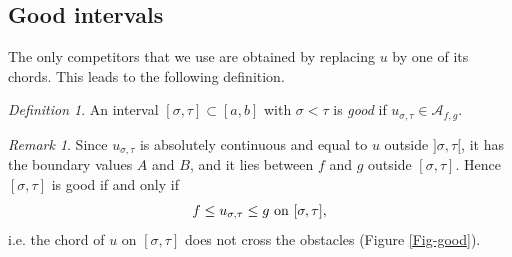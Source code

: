 \documentclass[reqno,12pt]{amsart}
\numberwithin{equation}{section}
\def\A{\mathcal{A}_{f,g}}
\theoremstyle{remark}
\newtheorem{definition}[theorem]{Definition}
\newtheorem{remark}[theorem]{Remark}
\begin{document}
\subsection{Good intervals} The only competitors that we use are obtained by replacing $u$ by one of its chords. This leads to the following definition.

\begin{definition}\label{Def-good}
An interval $[\sigma,\tau]\subset[a,b]$ with $\sigma<\tau$ is {\em good} if $u_{\sigma,\tau}\in\A$.
\end{definition}

\begin{remark}\label{Remark-good}
Since $u_{\sigma,\tau}$ is absolutely continuous and equal to $u$ outside $]\sigma,\tau[$, it has the boundary values $A$ and $B$, and it lies between $f$ and $g$ outside $[\sigma,\tau]$. Hence $[\sigma,\tau]$ is good if and only if
\begin{equation*}
f\leq u_{\sigma,\tau}\leq g\hbox{ on }[\sigma,\tau],
\end{equation*}
i.e. the chord of $u$ on $[\sigma,\tau]$ does not cross the obstacles (Figure \ref{Fig-good}).
\end{remark}
\end{document}

